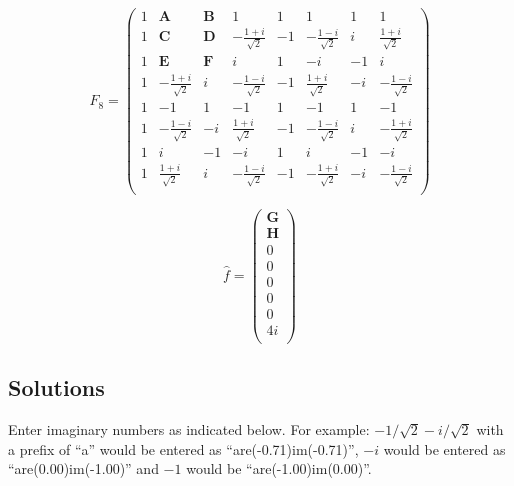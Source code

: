\begin{equation}
    F_8 = 
    \left(
        \begin{array}{cccccccc}
             1 & \textbf{A} & \textbf{B} & 1 & 1 & 1 & 1 & 1 \\
             1 & \textbf{C} & \textbf{D} & -\frac{1+i}{\sqrt{2}} & -1 & -\frac{1-i}{\sqrt{2}} & i & \frac{1+i}{\sqrt{2}} \\
             1 & \textbf{E} & \textbf{F} & i & 1 & -i & -1 & i \\
             1 & -\frac{1+i}{\sqrt{2}} & i & -\frac{1-i}{\sqrt{2}} & -1 & \frac{1+i}{\sqrt{2}} & -i & -\frac{1-i}{\sqrt{2}} \\
             1 & -1 & 1 & -1 & 1 & -1 & 1 & -1 \\
             1 & -\frac{1-i}{\sqrt{2}} & -i & \frac{1+i}{\sqrt{2}} & -1 & -\frac{1-i}{\sqrt{2}} & i & -\frac{1+i}{\sqrt{2}} \\
             1 & i & -1 & -i & 1 & i & -1 & -i \\
             1 & \frac{1+i}{\sqrt{2}} & i & -\frac{1-i}{\sqrt{2}} & -1 & -\frac{1+i}{\sqrt{2}} & -i & -\frac{1-i}{\sqrt{2}} \\
        \end{array}
    \right) 
\end{equation}


\begin{equation}
    \hat{f} =
    \left(
        \begin{array}{c}
             \textbf{G} \\
             \textbf{H} \\
             0 \\
             0 \\
             0 \\
             0 \\
             0 \\
             4 i \\
        \end{array}
    \right)
\end{equation}

\subsection*{Solutions}

Enter imaginary numbers as indicated below. For example: $-1/\sqrt{2}-i/\sqrt{2}$ with a prefix of ``a'' would be entered as ``are(-0.71)im(-0.71)'', $-i$ would be entered as ``are(0.00)im(-1.00)'' and $-1$ would be ``are(-1.00)im(0.00)''.

